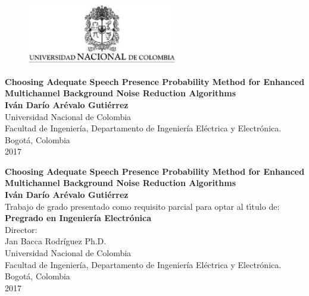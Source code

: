 \begin{center}
\begin{figure}
\centering%
\includegraphics[width=6.5cm]{HojaTitulo/EscudoUN}
\end{figure}
\thispagestyle{empty} \vspace*{1.0cm} \textbf{\huge
Choosing Adequate Speech Presence Probability Method for Enhanced Multichannel Background Noise Reduction Algorithms}\\[4.0cm]
\Large\textbf{Iván Darío Arévalo Gutiérrez}\\[4.0cm]
\small Universidad Nacional de Colombia\\
Facultad de Ingeniería, Departamento de Ingeniería Eléctrica y Electrónica.\\
Bogotá, Colombia\\
2017\\
\end{center}

\newpage{\pagestyle{empty}\cleardoublepage}

\newpage
\begin{center}
\thispagestyle{empty} \vspace*{0cm} \textbf{\huge
Choosing Adequate Speech Presence Probability Method for Enhanced Multichannel Background Noise Reduction Algorithms}\\[3.0cm]
\Large\textbf{Iván Darío Arévalo Gutiérrez}\\[3.0cm]
\small Trabajo de grado presentado como requisito parcial para optar al
t\'{\i}tulo de:\\
\textbf{Pregrado en Ingeniería Electrónica}\\[2.5cm]
Director:\\
Jan Bacca Rodríguez Ph.D.\\[4.5cm]

Universidad Nacional de Colombia\\
Facultad de Ingeniería, Departamento de Ingeniería Eléctrica y Electrónica.\\
Bogotá, Colombia\\
2017\\
\end{center}

